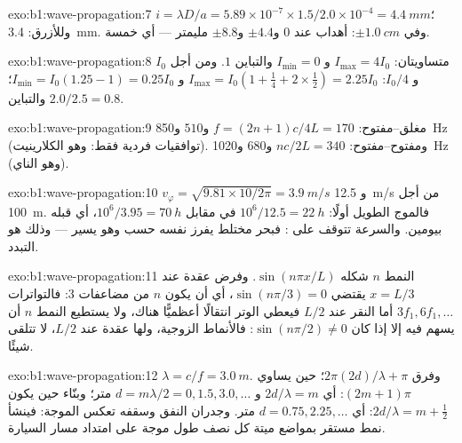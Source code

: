 \begin{solution}{exo:b1:wave-propagation:7}
$i = \lambda D/a = 5.89\times10^{-7} \times 1.5/2.0\times10^{-4} =
\qty{4.4}{mm}$؛ وللأزرق: \qty{3.4}{mm}. وفي $\pm\qty{1.0}{cm}$: أهداب عند
$0$ و$\pm 4.4$ و$\pm 8.8$ مليمتر --- أي خمسة.
\end{solution}

\begin{solution}{exo:b1:wave-propagation:8}
متساويتان: $I_{\max} = 4I_0$ و $I_{\min} = 0$ والتباين $1$. ومن أجل $I_0$ و $I_0/4$:
$I_{\max} = I_0(1 + \tfrac14 + 2 \times \tfrac12) = 2.25I_0$ و $I_{\min} =
I_0(1.25 - 1) = 0.25I_0$؛ والتباين $2.0/2.5 = 0.8$.
\end{solution}

\begin{solution}{exo:b1:wave-propagation:9}
مغلق--مفتوح: $f = (2n + 1)c/4L = 170$ و$510$ و\qty{850}{Hz} (توافقيات
فردية فقط: وهو الكلارينيت). ومفتوح--مفتوح: $nc/2L = 340$ و$680$
و\qty{1020}{Hz} (وهو الناي).
\end{solution}

\begin{solution}{exo:b1:wave-propagation:10}
$v_\varphi = \sqrt{9.81 \times 10/2\pi} = \qty{3.9}{m/s}$ و
\qty{12.5}{m/s} من أجل \qty{100}{m}. فالموج الطويل أولًا: $10^6/12.5 =
\qty{22}{h}$ في مقابل $10^6/3.95 = \qty{70}{h}$، أي قبله بيومين. والسرعة
تتوقف على : فبحر مختلط يفرز نفسه حسب  وهو
يسير --- وذلك هو التبدد.
\end{solution}

\begin{solution}{exo:b1:wave-propagation:11}
النمط $n$ شكله $\sin(n\pi x/L)$. وفرض عقدة عند $x = L/3$ يقتضي
$\sin(n\pi/3) = 0$، أي أن يكون $n$ من مضاعفات $3$: فالتواترات $3f_1,
6f_1, \dots$ أما النقر عند $L/2$ فيعطي الوتر انتقالًا أعظميًّا
هناك، ولا يستطيع النمط $n$ أن يسهم فيه إلا إذا كان $\sin(n\pi/2) \neq 0$:
فالأنماط الزوجية، ولها عقدة عند $L/2$، لا تتلقى شيئًا.
\end{solution}

\begin{solution}{exo:b1:wave-propagation:12}
$\lambda = c/f = \qty{3.0}{m}$. وفرق  $2\pi(2d)/\lambda + \pi$؛
 حين يساوي $(2m + 1)\pi$: أي $2d/\lambda = m$ و
$d = m\lambda/2 = 0, 1.5, 3.0, \dots$ متر؛ وبنّاء حين يكون $2d/\lambda =
m + \tfrac12$: أي $d = 0.75, 2.25, \dots$ متر. وجدران النفق وسقفه تعكس
الموجة: فينشأ نمط مستقر بمواضع ميتة كل نصف طول موجة على
امتداد مسار السيارة.
\end{solution}

